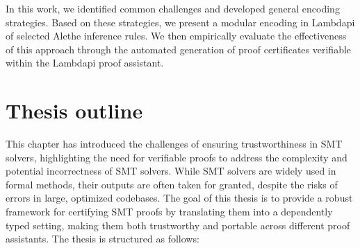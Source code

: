 In this work, we identified common challenges and developed general encoding strategies.
Based on these strategies, we present a modular encoding in Lambdapi of selected Alethe inference rules.
We then empirically evaluate the effectiveness of this approach through the automated generation of proof certificates verifiable within the Lambdapi proof assistant.

\section{Thesis outline}
\label{sec:thesis-outline}

This chapter has introduced the challenges of ensuring trustworthiness in SMT solvers, highlighting the need for verifiable proofs to address the complexity and potential incorrectness of SMT solvers.
While SMT solvers are widely used in formal methods, their outputs are often taken for granted, despite the risks of errors in large, optimized codebases.
The goal of this thesis is to provide a robust framework for certifying SMT proofs by translating them into a dependently typed setting, making them both trustworthy and portable across different proof assistants.
The thesis is structured as follows:


